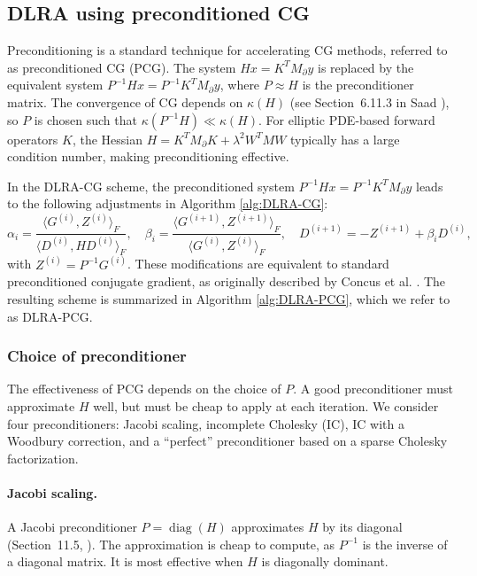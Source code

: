 \subsection{DLRA using preconditioned CG}
Preconditioning is a standard technique for accelerating CG methods, referred to as preconditioned CG (PCG). The system $H x = K^T M_\partial y$ is replaced by the equivalent system $P^{-1} H x = P^{-1} K^T M_\partial y$, where $P \approx H$ is the preconditioner matrix. The convergence of CG depends on $\kappa(H)$ (see Section~6.11.3 in Saad \cite{saadIterativeMethodsSparse2003}), so $P$ is chosen such that $\kappa(P^{-1} H) \ll \kappa(H)$. For elliptic PDE-based forward operators $K$, the Hessian $H = K^T M_\partial K + \lambda^2 W^T M W$ typically has a large condition number, making preconditioning effective.

In the DLRA-CG scheme, the preconditioned system $P^{-1} H x = P^{-1} K^T M_\partial y$ leads to the following adjustments in Algorithm \ref{alg:DLRA-CG}:
\begin{equation*}
    \alpha_i = \frac
    {\langle G^{(i)}, Z^{(i)} \rangle_F}
    {\langle D^{(i)}, H D^{(i)} \rangle_F}, \quad
    \beta_i = \frac
    {\langle G^{(i+1)}, Z^{(i+1)} \rangle_F}
    {\langle G^{(i)}, Z^{(i)} \rangle_F}, \quad
    D^{(i+1)} = -Z^{(i+1)} + \beta_i D^{(i)},
\end{equation*}
with $Z^{(i)} = P^{-1} G^{(i)}$. These modifications are equivalent to standard preconditioned conjugate gradient, as originally described by Concus et al. \cite{concusGeneralizedConjugateGradient1976}. The resulting scheme is summarized in Algorithm \ref{alg:DLRA-PCG}, which we refer to as DLRA-PCG.
%



\subsubsection{Choice of preconditioner}\label{sec:choice_of_preconditioner}
The effectiveness of PCG depends on the choice of $P$. A good preconditioner must approximate $H$ well, but must be cheap to apply at each iteration. We consider four preconditioners: Jacobi scaling, incomplete Cholesky (IC), IC with a Woodbury correction, and a ``perfect'' preconditioner based on a sparse Cholesky factorization.

\paragraph{Jacobi scaling.} A Jacobi preconditioner $P = \operatorname{diag}(H)$ approximates $H$ by its diagonal (Section~11.5, \cite{golubMatrixComputations4th2013}). The approximation is cheap to compute, as $P^{-1}$ is the inverse of a diagonal matrix. It is most effective when $H$ is diagonally dominant.
 
